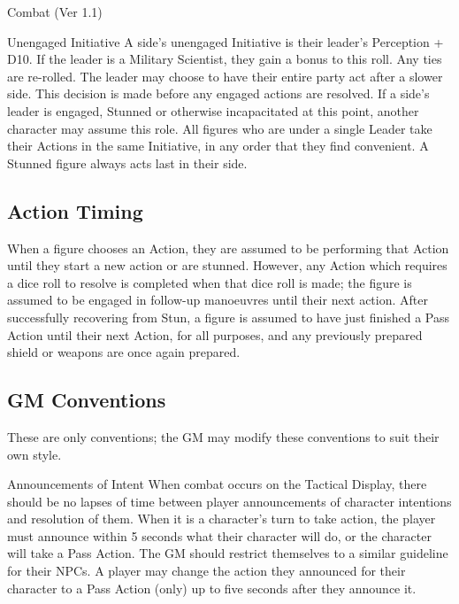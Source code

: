 \begin{Chapter}{Combat (Ver 1.1)}
\begin{Description}
\item[Unengaged Initiative] A side’s unengaged Initiative is their
  leader’s Perception + D10. If the leader is a Military Scientist,
  they gain a bonus to this roll. Any ties are re-rolled. The leader
  may choose to have their entire party act after a slower side.  This
  decision is made before any engaged actions are resolved. If a
  side’s leader is engaged, Stunned or otherwise incapacitated at this
  point, another character may assume this role. All figures who are
  under a single Leader take their Actions in the same Initiative, in
  any order that they find convenient.  A Stunned figure always acts
  last in their side.

\end{Description}

\subsection{Action Timing}

When a figure chooses an Action, they are assumed to be performing
that Action until they start a new action or are stunned. However, any
Action which requires a dice roll to resolve is completed when that
dice roll is made; the figure is assumed to be engaged in follow-up
manoeuvres until their next action.  After successfully recovering
from Stun, a figure is assumed to have just finished a Pass Action
until their next Action, for all purposes, and any previously prepared
shield or weapons are once again prepared.

\subsection{GM Conventions}

These are only conventions; the GM may modify these conventions to
suit their own style.

\begin{Description}
  
\item[Announcements of Intent] When combat occurs on the Tactical
  Display, there should be no lapses of time between player
  announcements of character intentions and resolution of them.  When
  it is a character’s turn to take action, the player must announce
  within 5 seconds what their character will do, or the character will
  take a Pass Action.  The GM should restrict themselves to a similar
  guideline for their NPCs. A player may change the action they
  announced for their character to a Pass Action (only) up to five
  seconds after they announce it.


\end{Description}
\end{Chapter}
